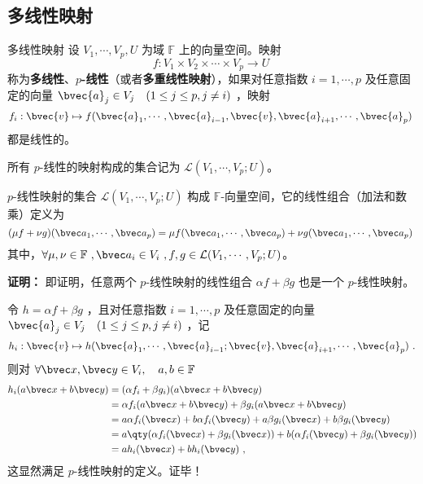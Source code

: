 
\begin{issues}
\issueTODO
\end{issues}


\subsection{多线性映射}
\begin{definition}{多线性映射}
设 $V_1,\cdots,V_p, U$ 为域 $\mathbb{F}$ 上的向量空间。映射
\begin{equation}
f:V_1\times V_2\times\cdots\times V_p\rightarrow U~
\end{equation}
称为\textbf{多线性}、\textbf{$p$-线性}（或者\textbf{多重线性映射}），如果对任意指数 $i=1,\cdots,p$ 及任意固定的向量 $\bvec{a}_j \in V_j\quad(1 \leq j \leq p,j\neq i)$ ，映射
\begin{equation}
f_i:\bvec{v}\mapsto f(\bvec{a}_1, \cdots, \bvec{a}_{i-1}, \bvec{v},\bvec{a}_{i+1}, \cdots,\bvec{a}_p)~
\end{equation}
都是线性的。
\end{definition}
所有 $p$-线性的映射构成的集合记为 $\mathcal{L}(V_1,\cdots,V_p;U)$。

\begin{theorem}{}
$p$-线性映射的集合 $\mathcal{L}(V_1,\cdots,V_p;U)$ 构成 $\mathbb{F}$-向量空间，它的线性组合（加法和数乘）定义为
\begin{equation}
(\mu f+\nu g)(\bvec a_1,\cdots,\bvec a_p)=\mu f(\bvec a_1,\cdots,\bvec a_p)+\nu g(\bvec a_1,\cdots,\bvec a_p)~
\end{equation}
其中，$\forall \mu,\nu \in\mathbb{F}~, \bvec a_i \in V_i~, f, g\in \mathcal{L}(V_1,\cdots,V_p;U)$。
\end{theorem}
\textbf{证明：} 即证明，任意两个 $p$-线性映射的线性组合 $\alpha f+\beta g$ 也是一个 $p$-线性映射。

令 $h=\alpha f+\beta g$ ，且对任意指数 $i=1,\cdots,p$ 及任意固定的向量 $\bvec{a}_j \in V_j\quad(1\leq j\leq p,j\neq i)$ ，记
\begin{equation}
h_i:\bvec{v}\mapsto h(\bvec{a}_1,\cdots,\bvec{a}_{i-1};\bvec{v},\bvec{a}_{i+1},\cdots,\bvec{a}_p)~.
\end{equation}
则对 $\forall \bvec x,\bvec y\in V_i,\quad a,b\in\mathbb{F}$
\begin{equation}
\begin{aligned}
h_i(a \bvec x+b\bvec y)&=(\alpha f_i+\beta g_i)(a \bvec x+b\bvec y)\\
&=\alpha f_i(a \bvec x+b\bvec y)+\beta g_i(a \bvec x+b\bvec y)\\
&=a\alpha f_i(\bvec x)+b\alpha f_i(\bvec y)+a\beta g_i(\bvec x)+b\beta g_i(\bvec y)\\
&=a\qty(\alpha f_i(\bvec x)+\beta g_i(\bvec x))+b(\alpha f_i(\bvec y)+\beta g_i(\bvec y))\\
&=ah_i(\bvec x)+bh_i(\bvec y)~,
\end{aligned}
\end{equation}
这显然满足 $p$-线性映射的定义。证毕！

